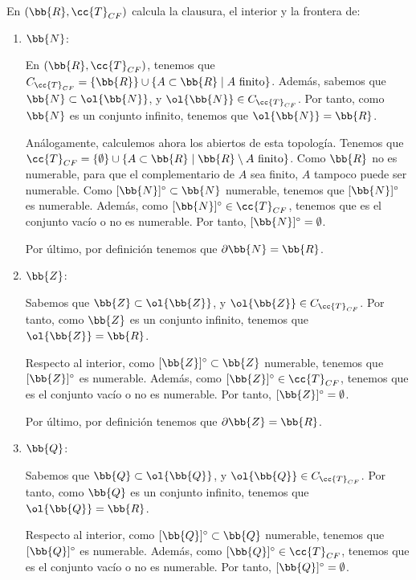 \begin{ejercicio}
    En $(\bb{R}, \cc{T}_{CF})$ calcula la clausura, el interior y la frontera de:
    \begin{enumerate}
        \item $\bb{N}$:

            En $(\bb{R}, \cc{T}_{CF})$, tenemos que $C_{\cc{T}_{CF}}=\{\bb{R}\}\cup \{A\subset \bb{R} \mid A \text{ finito}\}$. Además, sabemos que $\bb{N}\subset \ol{\bb{N}}$, y $\ol{\bb{N}}\in C_{\cc{T}_{CF}}$. Por tanto, como $\bb{N}$ es un conjunto infinito, tenemos que $\ol{\bb{N}}=\bb{R}$.

            Análogamente, calculemos ahora los abiertos de esta topología. Tenemos que $\cc{T}_{CF}=\{\emptyset\}\cup \{A\subset \bb{R}\mid \bb{R}\setminus A\text{ finito}\}$. Como $\bb{R}$ no es numerable, para que el complementario de $A$ sea finito, $A$ tampoco puede ser numerable. Como $[\bb{N}]^\circ \subset \bb{N}$ numerable, tenemos que $[\bb{N}]^\circ$ es numerable. Además, como $[\bb{N}]^\circ \in \cc{T}_{CF}$, tenemos que es el conjunto vacío o no es numerable. Por tanto, $[\bb{N}]^\circ = \emptyset$.
            
            Por último, por definición tenemos que $\partial \bb{N}=\bb{R}$.
            
        \item $\bb{Z}$:
            
            Sabemos que $\bb{Z}\subset \ol{\bb{Z}}$, y $\ol{\bb{Z}}\in C_{\cc{T}_{CF}}$. Por tanto, como $\bb{Z}$ es un conjunto infinito, tenemos que $\ol{\bb{Z}}=\bb{R}$.

            Respecto al interior, como $[\bb{Z}]^\circ \subset \bb{Z}$ numerable, tenemos que $[\bb{Z}]^\circ$ es numerable. Además, como $[\bb{Z}]^\circ \in \cc{T}_{CF}$, tenemos que es el conjunto vacío o no es numerable. Por tanto, $[\bb{Z}]^\circ = \emptyset$.

            Por último, por definición tenemos que $\partial \bb{Z}=\bb{R}$.
            
        \item $\bb{Q}$:
        
            Sabemos que $\bb{Q}\subset \ol{\bb{Q}}$, y $\ol{\bb{Q}}\in C_{\cc{T}_{CF}}$. Por tanto, como $\bb{Q}$ es un conjunto infinito, tenemos que $\ol{\bb{Q}}=\bb{R}$.

            Respecto al interior, como $[\bb{Q}]^\circ \subset \bb{Q}$ numerable, tenemos que $[\bb{Q}]^\circ$ es numerable. Además, como $[\bb{Q}]^\circ \in \cc{T}_{CF}$, tenemos que es el conjunto vacío o no es numerable. Por tanto, $[\bb{Q}]^\circ = \emptyset$.


\end{enumerate}
\end{ejercicio}

